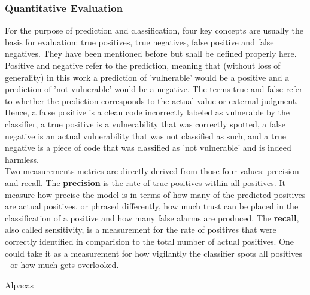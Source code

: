 \documentclass[
	a4paper,
	pagesize,
	pdftex,
	12pt,
	twoside, %
	BCOR=5mm, %
	ngerman,
	fleqn,
	final,
	]{scrartcl}
\begin{document}
\subsubsection{Quantitative Evaluation}\label{quantitative}
For the purpose of prediction and classification, four key concepts are usually the basis for evaluation: true positives, true negatives, false positive and false negatives. They have been mentioned before but shall be defined properly here. Positive and negative refer to the prediction, meaning that (without loss of generality) in this work a prediction of 'vulnerable' would be a positive and a prediction of 'not vulnerable' would be a negative. The terms true and false refer to whether the prediction corresponds to the actual value or external judgment. Hence, a false positive is a clean code incorrectly labeled as vulnerable by the classifier, a true positive is a vulnerability that was correctly spotted, a false negative is an actual vulnerability that was not classified as such, and a true negative is a piece of code that was classified as 'not vulnerable' and is indeed harmless.\\
Two measurements metrics are directly derived from those four values: precision and recall. The \textbf{precision} is the rate of true positives within all positives. It measure how precise the model is in terms of how many of the predicted positives are actual positives, or phrased differently, how much trust can be placed in the classification of a positive and how many false alarms are produced. The \textbf{recall}, also called sensitivity, is a measurement for the rate of positives that were correctly identified in comparision to the total number of actual positives. One could take it as a measurement for how vigilantly the classifier spots all positives - or how much gets overlooked.\newline

Alpacas ~\cite{SanMartin.1968}
\end{document}
